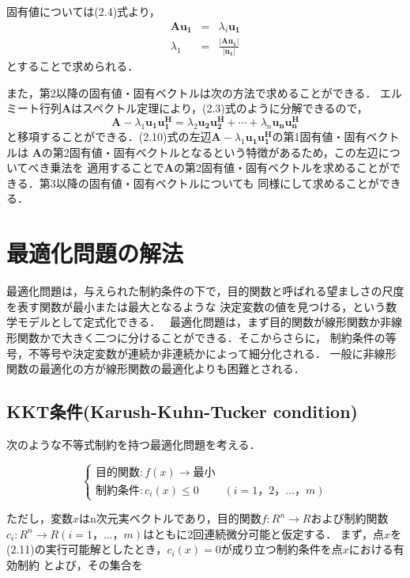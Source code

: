固有値については(2.4)式より，
\begin{eqnarray}
    \bm{Au_1}&=&\lambda_i\bm{u_1} \nonumber \\
    \lambda_1&=&\frac{\left| \bm{Au_1} \right|}{\left| \bm{u_1} \right|}
\end{eqnarray}
とすることで求められる．

また，第2以降の固有値・固有ベクトルは次の方法で求めることができる．
エルミート行列$\bm{A}$はスペクトル定理により，(2.3)式のように分解できるので，
\begin{equation}
    \bm{A} - \lambda_1\bm{u_1}\bm{u_1^H} = \lambda_2\bm{u_2}\bm{u_2^H} + \cdots + \lambda_n\bm{u_n}\bm{u_n^H}
\end{equation}
と移項することができる．(2.10)式の左辺$\bm{A} - \lambda_1\bm{u_1}\bm{u_1^H}$の第1固有値・固有ベクトルは
$\bm{A}$の第2固有値・固有ベクトルとなるという特徴があるため，この左辺についてべき乗法を
適用することで$\bm{A}$の第2固有値・固有ベクトルを求めることができる．第3以降の固有値・固有ベクトルについても
同様にして求めることができる．

\section{最適化問題の解法}
最適化問題は，与えられた制約条件の下で，目的関数と呼ばれる望ましさの尺度を表す関数が最小または最大となるような
決定変数の値を見つける，という数学モデルとして定式化できる．~\cite{ibaragi}
最適化問題は，まず目的関数が線形関数か非線形関数かで大きく二つに分けることができる．そこからさらに，
制約条件の等号，不等号や決定変数が連続か非連続かによって細分化される．
一般に非線形関数の最適化の方が線形関数の最適化よりも困難とされる．

\subsection{KKT条件(Karush-Kuhn-Tucker condition)}
次のような不等式制約を持つ最適化問題を考える．

\begin{equation}
    \left\{
        \begin{array}{cc}
            目的関数:f(x) \to 最小 & \\
            制約条件:c_i(x) \leq 0 & (i=1，2，\ldots，m)
        \end{array}
    \right.
\end{equation}

ただし，変数$x$はn次元実ベクトルであり，目的関数$f:R^n \to R$および制約関数
$c_i:R^n \to R(i=1，\ldots，m)$はともに2回連続微分可能と仮定する．
まず，点$x$を(2.11)の実行可能解としたとき，$c_i(x)=0$が成り立つ制約条件を点$x$における有効制約
とよび，その集合を

